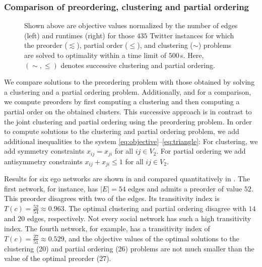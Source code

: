 \subsubsection{Comparison of preordering, clustering and partial ordering}

\begin{figure}
	\centering
	\small
    
    \caption{Shown above are objective values normalized by the number of edges (left) and runtimes (right) for those $435$ Twitter instances for which the preorder ($\lesssim$), partial order ($\leq$), and clustering ($\sim$) problems are solved to optimality within a time limit of $500\,$s. Here, $(\sim,\leq)$ denotes successive clustering and partial ordering.}
    \label{fig:clustering-vs-ordering-quantitative}
\end{figure}

We compare solutions to the preordering problem with those obtained by solving a clustering and a partial ordering problem.
Additionally, and for a comparison, we compute preorders by first computing a clustering and then computing a partial order on the obtained clusters.
This successive approach is in contrast to the joint clustering and partial ordering using the preordering problem.
In order to compute solutions to the clustering and partial ordering problem, we add additional inequalities to the system \eqref{eq:objective}--\eqref{eq:triangle}:
For clustering, we add symmetry constraints $x_{ij} = x_{ji}$ for all $ij \in V_2$. For partial ordering we add antisymmetry constraints $x_{ij} + x_{ji} \leq 1$ for all $ij \in V_2$.

Results for six ego networks are shown in  and compared quantitatively in .
The first network, for instance, has $|E|=54$ edges and admits a preorder of value $52$. 
This preorder disagrees with two of the edges.
Its transitivity index is $T(c) = \frac{52}{54} \approx 0.963$.
The optimal clustering and partial ordering disagree with $14$ and $20$ edges, respectively.
Not every social network has such a high transitivity index. 
The fourth network, for example, has a transitivity index of $T(c) = \frac{27}{51} \approx 0.529$,
and the objective values of the optimal solutions to the clustering (20) and partial ordering (26) problems are not much smaller than the value of the optimal preorder (27).

